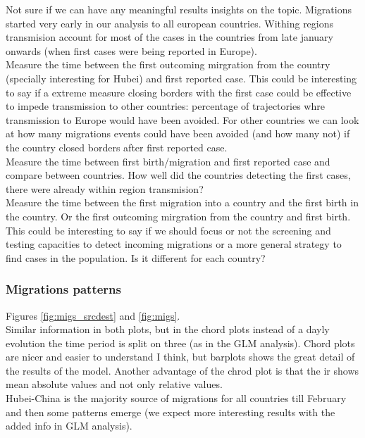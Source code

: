 \documentclass[12pt,]{article}
\begin{document}
 Not sure if we can have any meaningful results insights on the topic. Migrations started very early in our analysis to all european countries. Withing regions transmision account for most of the cases in the countries from late january onwards (when first cases were being reported in Europe).\\

 Measure the time between the first outcoming mirgration from the country  (specially interesting for Hubei) and first reported case. This could be interesting to say if a extreme measure closing borders with the first case could be effective to impede transmission to other countries: percentage of trajectories whre transmission to Europe would have been avoided. For other countries we can look at how many migrations events could have been avoided (and how many not) if the country closed borders after first reported case.\\ 

 Measure the time between first birth/migration and first reported case and compare between countries. How well did the countries detecting the first cases, there were already within region transmision?\\

 Measure the time between the first migration into a country and the first birth in the country. Or the first outcoming mirgration from the country and first birth. This could be interesting to say if we should focus or not the screening and testing capacities to detect incoming migrations or a more general strategy to find cases in the population. Is it different for each country?\\


\subsubsection*{Migrations patterns}
Figures \ref{fig:migs_srcdest} and \ref{fig:migs}.\\

Similar information in both plots, but in the chord plots instead of a dayly evolution the time period is split on three (as in the GLM analysis). Chord plots are nicer and easier to understand I think, but barplots shows the great detail of the results of the model. Another advantage of the chrod plot is that the ir shows mean absolute values and not only relative values.\\

Hubei-China is the majority source of migrations for all countries till February and then some patterns emerge (we expect more interesting results with the added info in GLM analysis).\\
\end{document}
